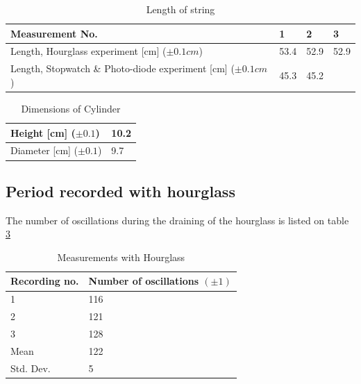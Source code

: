 \documentclass[%
 reprint,
 amsmath,amssymb,
 aps,
]{revtex4-1}
\begin{document}
        \begin{table}[h] %
            \center
            \caption{Length of string}
            \label{tab:stopwatch}
            \begin{tabular}{| p{5cm} | l | l | l |}
                \hline
                Measurement No. & 1 & 2 & 3 \\ \hline 
                Length, Hourglass experiment [cm] ($\pm 0.1cm$) 
                & 53.4 & 52.9 & 52.9\\ \hline
                Length, Stopwatch \& Photo-diode experiment [cm] ($\pm 0.1cm$) 
                & 45.3 & 45.2 &  \\ \hline
            \end{tabular}
        \end{table}

        \begin{table}[h] %
            \center
            \caption{Dimensions of Cylinder}
            \label{tab:cylinder}
            \begin{tabular}{| l | l |}
                \hline
                Height [cm] ($\pm 0.1$)& 10.2 \\ \hline 
                Diameter [cm] ($\pm 0.1$)& 9.7 \\ \hline

            \end{tabular}
        \end{table}

	\subsection{Period recorded with hourglass}

        The number of oscillations during the draining of the hourglass is listed on table \ref{tab:hourglass}

    	\begin{table}[h] %
            \center
            \caption{Measurements with Hourglass}
            \label{tab:hourglass}
            \begin{tabular}{| l | l |}
                \hline
                Recording no. & Number of oscillations $(\pm 1)$\\ \hline
                1 & 116 \\ \hline
                2 & 121 \\ \hline
                3 & 128 \\ \hline
                \hline
                Mean & 122 \\ \hline
                Std. Dev. & 5 \\\hline
            \end{tabular}
    	\end{table}
\end{document}
